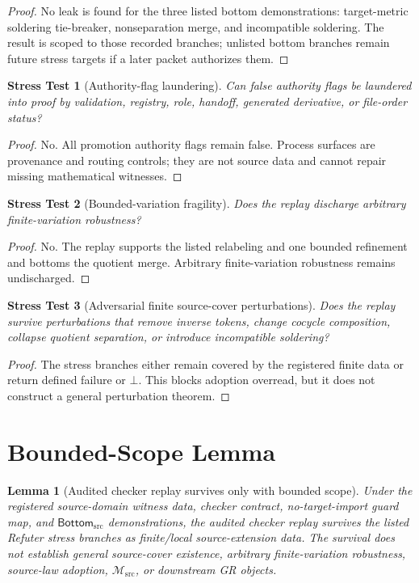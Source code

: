 \documentclass[11pt]{article}
\newcommand{\Msrc}{\mathcal{M}_{\mathrm{src}}}
\newcommand{\BottomSrc}{\mathsf{Bottom}_{\mathrm{src}}}
\newcommand{\Bot}{\bot}
\newtheorem{stress}{Stress Test}
\newtheorem{lemma}{Lemma}
\begin{document}
\begin{proof}
No leak is found for the three listed bottom demonstrations: target-metric
soldering tie-breaker, nonseparation merge, and incompatible soldering. The
result is scoped to those recorded branches; unlisted bottom branches remain
future stress targets if a later packet authorizes them.
\end{proof}

\begin{stress}[Authority-flag laundering]
Can false authority flags be laundered into proof by validation, registry,
role, handoff, generated derivative, or file-order status?
\end{stress}

\begin{proof}
No. All promotion authority flags remain false. Process surfaces are
provenance and routing controls; they are not source data and cannot repair
missing mathematical witnesses.
\end{proof}

\begin{stress}[Bounded-variation fragility]
Does the replay discharge arbitrary finite-variation robustness?
\end{stress}

\begin{proof}
No. The replay supports the listed relabeling and one bounded refinement and
bottoms the quotient merge. Arbitrary finite-variation robustness remains
undischarged.
\end{proof}

\begin{stress}[Adversarial finite source-cover perturbations]
Does the replay survive perturbations that remove inverse tokens, change
cocycle composition, collapse quotient separation, or introduce incompatible
soldering?
\end{stress}

\begin{proof}
The stress branches either remain covered by the registered finite data or
return defined failure or \(\Bot\). This blocks adoption overread, but it does
not construct a general perturbation theorem.
\end{proof}

\section{Bounded-Scope Lemma}

\begin{lemma}[Audited checker replay survives only with bounded scope]
Under the registered source-domain witness data, checker contract,
no-target-import guard map, and \(\BottomSrc\) demonstrations, the audited
checker replay survives the listed Refuter stress branches as
finite/local source-extension data. The survival does not establish general
source-cover existence, arbitrary finite-variation robustness, source-law
adoption, \(\Msrc\), or downstream GR objects.
\end{lemma}
\end{document}
